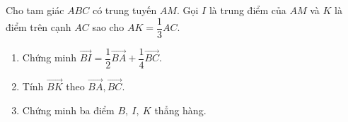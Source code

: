 \begin{bt}%
	Cho tam giác $A B C$ có trung tuyến $A M$. Gọi $I$ là trung điểm của $A M$ và $K$ là điểm trên cạnh $A C$ sao cho $A K=\dfrac{1}{3} A C$.
	\begin{enumerate}
	\item Chứng minh $\overrightarrow{B I}=\dfrac{1}{2} \overrightarrow{B A}+\dfrac{1}{4} \overrightarrow{B C}$.
	\item Tính $\overrightarrow{B K}$ theo $\overrightarrow{B A}, \overrightarrow{B C}$.
	\item Chứng minh ba điểm $B,~ I,~ K$ thẳng hàng.
	\end{enumerate}
\end{bt}
